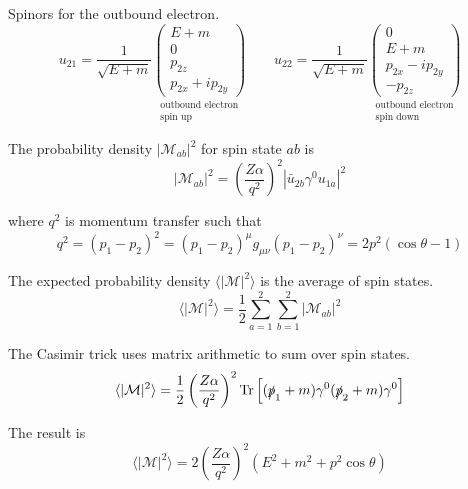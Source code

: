 Spinors for the outbound electron.
\begin{equation*}
u_{21}=\frac{1}{\sqrt{E+m}}
\underset{\substack{\text{outbound electron}\\ \text{spin up}}}
{\begin{pmatrix}E+m\\0\\p_{2z}\\p_{2x}+ip_{2y}\end{pmatrix}}
\qquad
u_{22}=\frac{1}{\sqrt{E+m}}
\underset{\substack{\text{outbound electron}\\ \text{spin down}}}
{\begin{pmatrix}0\\E+m\\p_{2x}-ip_{2y}\\-p_{2z}\end{pmatrix}}
\end{equation*}

The probability density $|\mathcal M_{ab}|^2$ for spin state $ab$ is
\begin{equation*}
|\mathcal{M}_{ab}|^2=\left(\frac{Z\alpha}{q^2}\right)^2\left|\bar{u}_{2b}\gamma^0 u_{1a}\right|^2
\end{equation*}

where $q^2$ is momentum transfer such that
\begin{equation*}
q^2=(p_1-p_2)^2=(p_1-p_2)^\mu g_{\mu\nu}(p_1-p_2)^\nu=2p^2(\cos\theta-1)
\end{equation*}

The expected probability density
$\langle\vert\mathcal{M}\vert^2\rangle$
is the average of spin states.
\begin{equation*}
\langle\vert\mathcal{M}\vert^2\rangle
=\frac{1}{2}\sum_{a=1}^2\sum_{b=1}^2\left|\mathcal{M}_{ab}\right|^2
\end{equation*}

The Casimir trick uses matrix arithmetic to sum over spin states.
\begin{equation*}
\langle\vert\mathcal{M}\vert^2\rangle
=\frac{1}{2}\left(\frac{Z\alpha}{q^2}\right)^2
\operatorname{Tr}\left[(\slashed{p}_1+m)\gamma^0(\slashed{p}_2+m)\gamma^0\right]
\end{equation*}

The result is
\begin{equation*}
\langle\vert\mathcal{M}\vert^2\rangle
=2\left(\frac{Z\alpha}{q^2}\right)^2\left(E^2+m^2+p^2\cos\theta\right)
\end{equation*}

